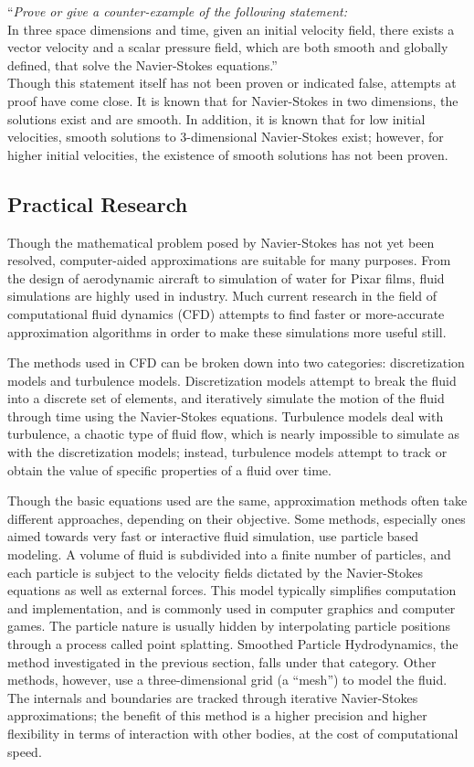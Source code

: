 \documentclass[a4paper]{article}
\begin{document}
``\emph{Prove or give a counter-example of the following statement:}\\

In three space dimensions and time, given an initial velocity field, there exists a vector velocity and a scalar pressure field, which are both smooth and globally defined, that solve the Navier-Stokes equations.''\\


Though this statement itself has not been proven or indicated false, attempts at proof have come close. It is known that for Navier-Stokes in two dimensions, the solutions exist and are smooth. In addition, it is known that for low initial velocities, smooth solutions to 3-dimensional Navier-Stokes exist; however, for higher initial velocities, the existence of smooth solutions has not been proven. 

\subsection*{Practical Research}
Though the mathematical problem posed by Navier-Stokes has not yet been resolved, computer-aided approximations are suitable for many purposes. From the design of aerodynamic aircraft to simulation of water for Pixar films, fluid simulations are highly used in industry. Much current research in the field of computational fluid dynamics (CFD) attempts to find faster or more-accurate approximation algorithms in order to make these simulations more useful still.

The methods used in CFD can be broken down into two categories: discretization models and turbulence models. Discretization models attempt to break the fluid into a discrete set of elements, and iteratively simulate the motion of the fluid through time using the Navier-Stokes equations. Turbulence models deal with turbulence, a chaotic type of fluid flow, which is nearly impossible to simulate as with the discretization models; instead, turbulence models attempt to track or obtain the value of specific properties of a fluid over time.

Though the basic equations used are the same, approximation methods often take different approaches, depending on their objective. Some methods, especially ones aimed towards very fast or interactive fluid simulation, use particle based modeling. A volume of fluid is subdivided into a finite number of particles, and each particle is subject to the velocity fields dictated by the Navier-Stokes equations as well as external forces. This model typically simplifies computation and implementation, and is commonly used in computer graphics and computer games. The particle nature is usually hidden by interpolating particle positions through a process called point splatting. Smoothed Particle Hydrodynamics, the method investigated in the previous section, falls under that category.  Other methods, however, use a three-dimensional grid (a ``mesh'') to model the fluid. The internals and boundaries are tracked through iterative Navier-Stokes approximations; the benefit of this method is a higher precision and higher flexibility in terms of interaction with other bodies, at the cost of computational speed. 
\end{document}
